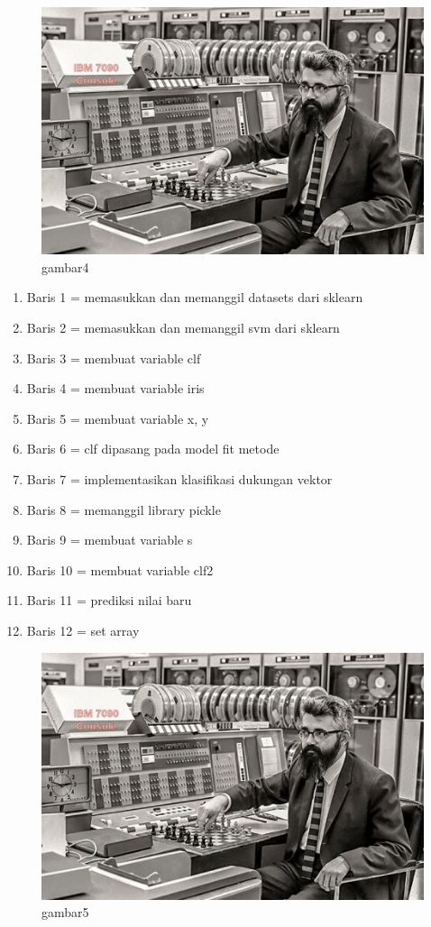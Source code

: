 \begin{figure}[ht]
\centering
\includegraphics[scale=0.10]{figures/contoh.jpg}
\caption{gambar4}
\label{roza4}
\end{figure}

\begin {enumerate}
\item Baris 1 = memasukkan dan memanggil datasets dari sklearn
\item Baris 2 = memasukkan dan memanggil svm dari sklearn
\item Baris 3 = membuat variable clf
\item Baris 4 = membuat variable iris
\item Baris 5 = membuat variable x, y
\item Baris 6 = clf dipasang pada model fit metode
\item Baris 7 = implementasikan klasifikasi dukungan vektor
\item Baris 8 = memanggil library pickle
\item Baris 9 = membuat variable s
\item Baris 10 = membuat variable clf2
\item Baris 11 = prediksi nilai baru
\item Baris 12 = set array
\end {enumerate}

\begin{figure}[ht]
\centering
\includegraphics[scale=0.7]{figures/contoh.jpg}
\caption{gambar5}
\label{roza5}
\end{figure}

